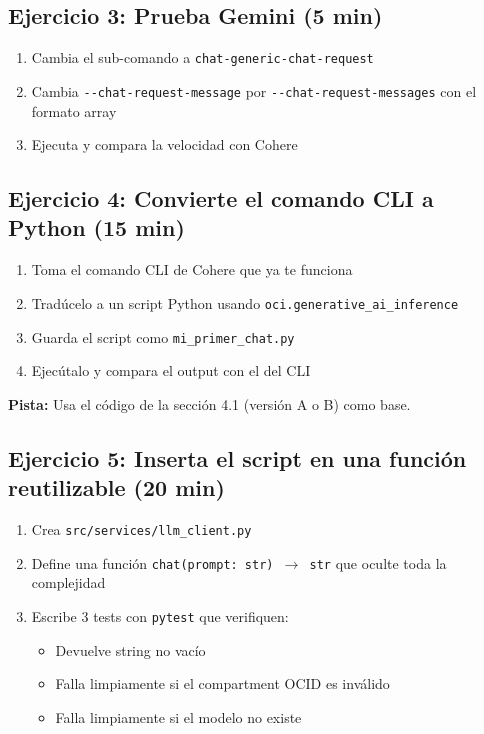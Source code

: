 \documentclass[11pt,a4paper,oneside]{article}
\newcommand{\filename}[1]{\texttt{\small #1}}
\begin{document}
\subsection{Ejercicio 3: Prueba Gemini (5 min)}

\begin{enumerate}
  \item Cambia el sub-comando a \texttt{chat-generic-chat-request}
  \item Cambia \texttt{-{}-chat-request-message} por \texttt{-{}-chat-request-messages} con el formato array
  \item Ejecuta y compara la velocidad con Cohere
\end{enumerate}

\subsection{Ejercicio 4: Convierte el comando CLI a Python (15 min)}

\begin{enumerate}
  \item Toma el comando CLI de Cohere que ya te funciona
  \item Trad\'{u}celo a un script Python usando \texttt{oci.generative\_ai\_inference}
  \item Guarda el script como \filename{mi\_primer\_chat.py}
  \item Ejec\'{u}talo y compara el output con el del CLI
\end{enumerate}

\textbf{Pista:} Usa el código de la secci\'on 4.1 (versi\'on A o B) como base.

\subsection{Ejercicio 5: Inserta el script en una función reutilizable (20 min)}

\begin{enumerate}
  \item Crea \filename{src/services/llm\_client.py}
  \item Define una función \texttt{chat(prompt: str) $\rightarrow$ str} que oculte toda la complejidad
  \item Escribe 3 tests con \texttt{pytest} que verifiquen:
  \begin{itemize}
    \item Devuelve string no vacío
    \item Falla limpiamente si el compartment OCID es inválido
    \item Falla limpiamente si el modelo no existe
  \end{itemize}
\end{enumerate}
\end{document}

